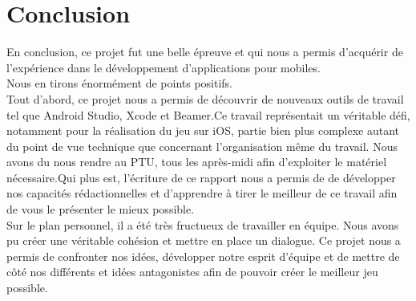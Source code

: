 \documentclass[a4paper]{article}
\begin{document}
\part*{Conclusion}
\Large
En conclusion, ce projet fut une belle épreuve et qui nous a permis d’acquérir de l’expérience dans le développement d'applications pour mobiles.\\
Nous en tirons énormément de points positifs.\\
Tout d'abord, ce projet nous a permis de découvrir de nouveaux outils de travail tel que Android Studio, Xcode et Beamer.Ce travail représentait un véritable défi, notamment pour la réalisation du jeu sur iOS, partie bien plus complexe autant du point de vue technique que concernant l'organisation même du travail. Nous avons du nous rendre au PTU, tous les après-midi afin d'exploiter le matériel nécessaire.Qui plus est, l'écriture de ce rapport nous a permis de de développer nos capacités rédactionnelles et d'apprendre à tirer le meilleur de ce travail afin de vous le présenter le mieux possible.\\
Sur le plan personnel, il a été très fructueux de travailler en équipe. Nous avons pu créer une véritable cohésion et mettre en place un dialogue. Ce projet nous a permis de confronter nos idées, développer notre esprit d'équipe et de mettre de côté nos différents et idées antagonistes afin de pouvoir créer le meilleur jeu possible.\\



\end{document}
